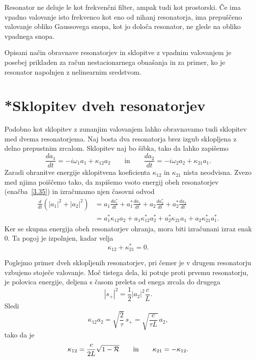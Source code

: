 Resonator ne deluje le kot frekvenčni filter, ampak tudi
kot prostorski. Če ima vpadno valovanje isto frekvenco kot
eno od nihanj resonatorja, ima prepuščeno valovanje obliko
Gaussovega snopa, kot jo določa resonator, ne glede na obliko vpadnega
snopa.

Opisani  način obravnave resonatorjev in sklopitve z vpadnim valovanjem
je posebej prikladen za račun nestacionarnega obnašanja in za primer,
ko je resonator napolnjen z nelinearnim sredstvom.

\section{*Sklopitev dveh resonatorjev}
Podobno kot sklopitev z zunanjim valovanjem lahko obravnavamo tudi
sklopitev med dvema resonatorjema. Naj bosta dva resonatorja brez izgub
sklopljena z delno prepustnim zrcalom. Sklopitev naj bo šibka, tako da lahko zapišemo 
\begin{equation}
\frac{da_1}{dt} =  -i\omega_{1}a_{1}+\kappa_{12}a_{2} \qquad \mathrm{in} \qquad 
\frac{da_2}{dt} = -i\omega_{2}a_{2}+\kappa_{21}a_{1}.
\end{equation}
Zaradi ohranitve energije sklopitvena koeficienta $\kappa_{12}$ in
$\kappa_{21}$ nista neodvisna. Zvezo med njima poiščemo tako, da zapišemo 
vsoto energij obeh resonatorjev (enačba~\ref{3.35}) in izračunamo njen časovni odvod
\begin{align}
\frac{d}{dt}\left(|a_{1}|^{2}+|a_{2}|^{2}\right) & =  a_{1}\frac{da_1^*}{dt}+a_{1}^{*}\frac{da_1}{dt}+
a_{2}\frac{da_2^*}{dt}+a_{2}^{*}\frac{da_2}{dt}\nonumber \\
 & =  a_{1}^{*}\kappa_{12}a_{2}+a_{1}\kappa_{12}^{*}a_{2}^{*}+a_{2}^{*}\kappa_{21}a_{1}+
 a_{2}\kappa_{21}^{*}a_{1}^{*}.
\end{align}
Ker se skupna energija obeh resonatorjev ohranja, mora biti izračunani izraz enak  $0$.
Ta pogoj je izpolnjen, kadar velja 
\begin{equation}
\kappa_{12}+\kappa_{21}^{*}=0.
\label{3.56}
\end{equation}
\newpage

Poglejmo primer dveh sklopljenih resonatorjev, pri čemer je v drugem resonatorju vzbujeno 
stoječe valovanje. Moč tistega dela, ki potuje proti prvemu resonatorju,
je polovica energije, deljena s časom preleta od enega zrcala do drugega
\begin{equation}
|s_{+}|^{2}=\frac{1}{2}|a_{2}|^{2}\frac{c}{L}.
\label{3.57}
\end{equation}
Sledi
\begin{equation}
\kappa_{12}a_{2}=\sqrt{\frac{2}{\tau}}\, s_{+}=\sqrt{\frac{c}{\tau L}}\, a_{2},
\label{3.58}
\end{equation}
 tako da je 
\begin{equation}
\kappa_{12}=\frac{c}{2L}\sqrt{1-{\cal R}}\qquad \mathrm{in} \qquad \kappa_{21}=-\kappa_{12}.
\label{3.59}
\end{equation}

